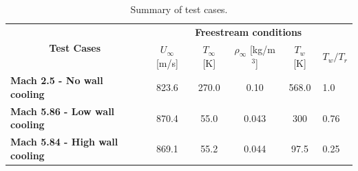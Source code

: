 \documentclass[journal ]{new-aiaa}
\begin{document}


\begin{table}
\centering
\caption{Summary of test cases.}
\label{tbl:test-cases}
\begin{tabular}{|l|ccccl|}
\hline
\multicolumn{1}{|c|}{\multirow{2}{*}{\textbf{Test Cases}}} &
  \multicolumn{5}{c|}{\textbf{Freestream conditions}} \\ \cline{2-6} 
\multicolumn{1}{|c|}{} &
  \multicolumn{1}{c|}{$U_\infty$ [m/s]} &
  \multicolumn{1}{c|}{$T_\infty$ [K]} &
  \multicolumn{1}{c|}{$\rho_\infty$ [kg/m$^3$]} &
  \multicolumn{1}{c|}{$T_{w}$ [K]} &
  \textbf{$T_{w}/T_{r}$} \\ \hline
\textbf{Mach 2.5 - No wall cooling} &
  \multicolumn{1}{c|}{823.6} &
  \multicolumn{1}{c|}{270.0} &
  \multicolumn{1}{c|}{0.10} &
  \multicolumn{1}{c|}{568.0} &
  1.0 \\ \hline
\textbf{Mach 5.86 - Low wall cooling} &
  \multicolumn{1}{c|}{870.4} &
  \multicolumn{1}{c|}{55.0} &
  \multicolumn{1}{c|}{0.043} &
  \multicolumn{1}{c|}{300} &
  0.76 \\ \hline
\textbf{Mach 5.84 - High wall cooling} &
  \multicolumn{1}{c|}{869.1} &
  \multicolumn{1}{c|}{55.2} &
  \multicolumn{1}{c|}{0.044} &
  \multicolumn{1}{c|}{97.5} &
  0.25 \\ \hline
\end{tabular}
\end{table}
\end{document}
